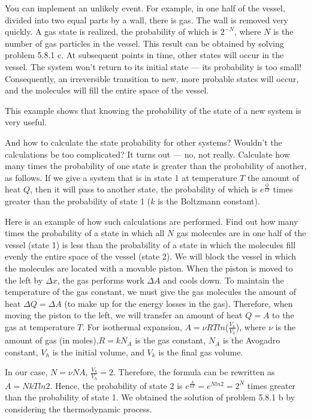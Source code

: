 \documentclass{article}
\begin{document}
\begin{enumerate}[label=5.8.\arabic*]
You can implement an unlikely event. For example, in one half of the vessel, divided into two equal parts by a wall, there is gas. The wall is removed very quickly. A gas state is realized, the probability of which is $2^{-N}$, where $N$ is the number of gas particles in the vessel. This result can be obtained by solving problem 5.8.1 c. At subsequent points in time, other states will occur in the vessel. The system won't return to its initial state — its probability is too small! Consequently, an irreversible transition to new, more probable states will occur, and the molecules will fill the entire space of the vessel. 

This example shows that knowing the probability of the state of a new system is very useful.

And how to calculate the state probability for other systems? Wouldn't the calculations be too complicated? It turns out — no, not really. Calculate how many times the probability of one state is greater than the probability of another, as follows. If we give a system that is in state 1 at temperature $T$ the amount of heat $Q$, then it will pass to another state, the probability of which is  $e^{\frac{Q}{kT}}$ times greater than the probability of state 1 ($k$ is the Boltzmann constant).

Here is an example of how such calculations are performed. Find out how many times the probability of a state in which all $N$ gas molecules are in one half of the vessel (state 1) is less than the probability of a state in which the molecules fill evenly the entire space of the vessel (state 2). We will block the vessel in which the molecules are located with a movable piston. When the piston is moved to the left by $\Delta x$, the gas performs work $\Delta A$ and cools down. To maintain the temperature of the gas constant, we must give the gas molecules the amount of heat $\Delta Q = \Delta A$ (to make up for the energy losses in the gas). Therefore, when moving the piston to the left, we will transfer an amount of heat $Q = A$ to the gas at temperature $T$. For isothermal expansion, $A = \nu R T l n $($\frac{V_k}{V_h}$), where $\nu$ is the amount of gas (in moles),$R = k N_A$ is the gas constant, $N_A$ is the Avogadro constant, $V_h$ is the initial volume, and $V_k$ is the final gas volume. 

In our case, $N = \nu NA$, $\frac{V_k}{V_h} = 2$. Therefore, the formula can be rewritten as $A = N k T ln 2$. Hence, the probability of state 2 is  $e^{\frac{A}{kT}} =  e^{N ln 2} = 2^N $ times greater than the probability of state 1. We obtained the solution of problem 5.8.1 b by considering the thermodynamic process.


\end{enumerate}
\end{document}
